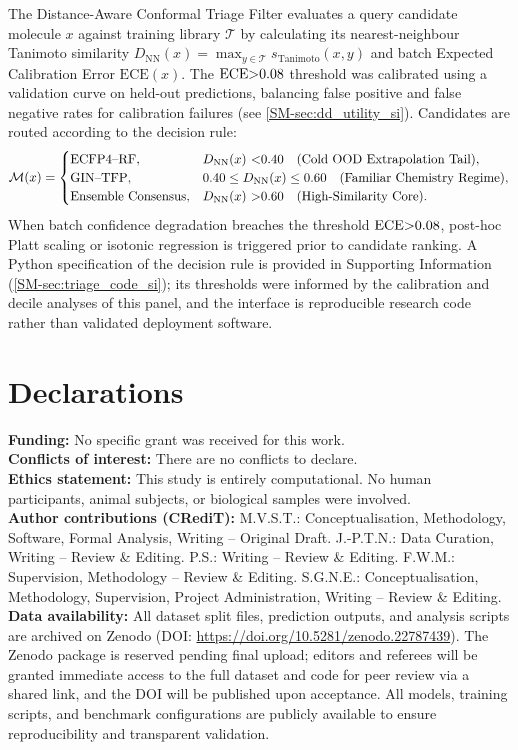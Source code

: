\documentclass[11pt,a4paper]{article}
\begin{document}
The Distance-Aware Conformal Triage Filter evaluates a query candidate molecule $x$ against training library $\mathcal{T}$ by calculating its nearest-neighbour Tanimoto similarity $D_{\text{NN}}(x) = \max_{y \in \mathcal{T}} s_{\mathrm{Tanimoto}}(x, y)$ and batch Expected Calibration Error $\mathrm{ECE}(x)$. The $\mathrm{ECE} \num{>0.08}$ threshold was calibrated using a validation curve on held-out predictions, balancing false positive and false negative rates for calibration failures (see \cref{SM-sec:dd_utility_si}). Candidates are routed according to the decision rule:
\begin{equation}\label{eq:conformal_triage}
\mathcal{M}(x) = 
\begin{cases}
\text{ECFP4--RF}, & D_{\text{NN}}(x)\ \num{<0.40} \quad \text{(Cold OOD Extrapolation Tail)}, \\
\text{GIN--TFP}, & \num{0.40} \le D_{\text{NN}}(x) \le \num{0.60} \quad \text{(Familiar Chemistry Regime)}, \\
\text{Ensemble Consensus}, & D_{\text{NN}}(x)\ \num{>0.60} \quad \text{(High-Similarity Core)}.
\end{cases}
\end{equation}
When batch confidence degradation breaches the threshold $\mathrm{ECE} \num{>0.08}$, post-hoc Platt scaling or isotonic regression is triggered prior to candidate ranking. A Python specification of the decision rule is provided in Supporting Information (\cref{SM-sec:triage_code_si}); its thresholds were informed by the calibration and decile analyses of this panel, and the interface is reproducible research code rather than validated deployment software.

\section*{Declarations}
\noindent\textbf{Funding:} No specific grant was received for this work.\\
\noindent\textbf{Conflicts of interest:} There are no conflicts to declare.\\
\noindent\textbf{Ethics statement:} This study is entirely computational. No human participants, animal subjects, or biological samples were involved.\\
\noindent\textbf{Author contributions (CRediT):} M.V.S.T.: Conceptualisation, Methodology, Software, Formal Analysis, Writing -- Original Draft. J.-P.T.N.:  Data Curation, Writing -- Review \& Editing. P.S.: Writing -- Review \& Editing. F.W.M.: Supervision, Methodology -- Review \& Editing. S.G.N.E.: Conceptualisation, Methodology, Supervision, Project Administration, Writing -- Review \& Editing.\\
\noindent\textbf{Data availability:} All dataset split files, prediction outputs, and analysis scripts are archived on Zenodo (DOI: \url{https://doi.org/10.5281/zenodo.22787439}). The Zenodo package is reserved pending final upload; editors and referees will be granted immediate access to the full dataset and code for peer review via a shared link, and the DOI will be published upon acceptance. All models, training scripts, and benchmark configurations are publicly available to ensure reproducibility and transparent validation.
\end{document}
